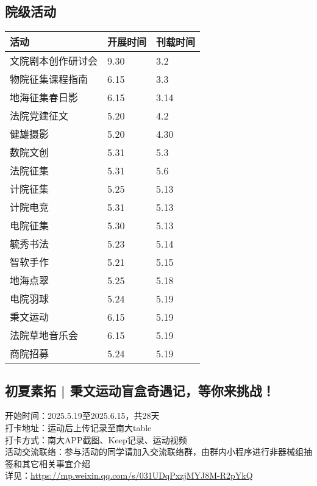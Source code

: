 \documentclass[letterpaper, 12pt]{article}
\begin{document}
\begin{multicols}{2}
\section{院级活动}
\begin{tabular}{|>{\centering\arraybackslash}m{}|m{}|m{}|}


\hline
    活动 & 开展时间 & 刊载时间\\
    \hline\hline
    文院剧本创作研讨会 & 9.30 & 3.2\\
    物院征集课程指南 & 6.15 & 3.3\\
    地海征集春日影 & 6.15 & 3.14\\
    法院党建征文 & 5.20 & 4.2\\
    健雄摄影 & 5.20 & 4.30\\
    数院文创 & 5.31 & 5.3\\
    法院征集 & 5.31 & 5.6\\
    计院征集 & 5.25 & 5.13\\
    计院电竞 & 5.31 & 5.13\\
    电院征集 & 5.30 & 5.13\\
    毓秀书法 & 5.23 & 5.14\\
    智软手作 & 5.21 & 5.15\\
    地海点翠 & 5.25 & 5.18\\
    电院羽球 & 5.24 & 5.19\\
    秉文运动 & 6.15 & 5.19\\
    法院草地音乐会 & 6.15 & 5.19\\
    商院招募 & 5.24 & 5.19\\
    \hline
\end{tabular}


\subsection{初夏素拓 | 秉文运动盲盒奇遇记，等你来挑战！} %
开始时间：2025.5.19至2025.6.15，共28天
\\打卡地址：运动后上传记录至南大table
\\打卡方式：南大APP截图、Keep记录、运动视频
\\活动交流联络：参与活动的同学请加入交流联络群，由群内小程序进行非器械组抽签和其它相关事宜介绍
\\详见：\url{https://mp.weixin.qq.com/s/031UDqPxzjMYJ8M-R2pYkQ}


\end{multicols}
\end{document}
